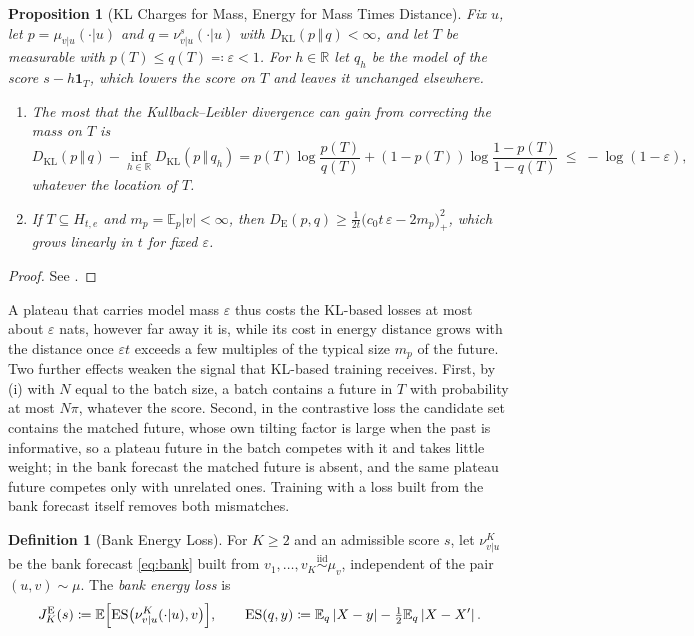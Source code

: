 \documentclass[11pt]{article}
\theoremstyle{plain}
\newtheorem{proposition}[theorem]{Proposition}
\theoremstyle{definition}
\newtheorem{definition}[theorem]{Definition}
\theoremstyle{remark}
\newcommand{\RR}{\mathbb{R}}
\newcommand{\E}{\mathbb{E}}
\newcommand{\define}{\coloneqq}
\newcommand{\KL}[2]{D_{\mathrm{KL}}\!\left(#1\,\Vert\,#2\right)}
\newcommand{\DE}{D_{\mathrm{E}}}
\newcommand{\abs}[1]{\left\lvert #1 \right\rvert}
\newcommand{\indicator}{\mathbf{1}}
\begin{document}
\begin{proposition}[KL Charges for Mass, Energy for Mass Times Distance]
 \label{prop:klvsenergy}
 Fix $u$, let $p=\mu_{v\vert u}(\cdot\vert u)$ and $q=\nu^{s}_{v\vert u}(\cdot\vert u)$
 with $\KL{p}{q}<\infty$, and let $T$ be measurable with
 $p(T)\le q(T)\eqqcolon\varepsilon<1$. For $h\in\RR$ let $q_h$ be the model of
 the score $s-h\indicator_T$, which lowers the score on $T$ and leaves it
 unchanged elsewhere.
 \begin{enumerate}[label=(\roman*)]
  \item The most that the Kullback--Leibler divergence can gain from
        correcting the mass on $T$ is
        \begin{equation*}
         \KL{p}{q}-\inf_{h\in\RR}\KL{p}{q_h}
         =p(T)\log\frac{p(T)}{q(T)}+(1-p(T))\log\frac{1-p(T)}{1-q(T)}
         \;\le\;-\log(1-\varepsilon),
        \end{equation*}
        whatever the location of $T$.
  \item If $T\subseteq H_{t,e}$ and $m_p=\E_p\abs{v}<\infty$, then
        $\DE(p,q)\ge\frac{1}{2t}\bigl(c_0t\,\varepsilon-2m_p\bigr)_{+}^{2}$,
        which grows linearly in $t$ for fixed $\varepsilon$.
 \end{enumerate}
\end{proposition}
\begin{proof}
 See .
\end{proof}

A plateau that carries model mass $\varepsilon$ thus costs the KL-based losses
at most about $\varepsilon$ nats, however far away it is, while its cost in
energy distance grows with the distance once $\varepsilon t$ exceeds a few
multiples of the typical size $m_p$ of the future. Two further effects weaken
the signal that KL-based training receives. First, by
(i) with $N$ equal to the batch size, a batch contains a
future in $T$ with probability at most $N\pi$, whatever the score. Second, in
the contrastive loss the candidate set contains the matched future, whose own
tilting factor is large when the past is informative, so a plateau future in
the batch competes with it and takes little weight; in the bank forecast the
matched future is absent, and the same plateau future competes only with
unrelated ones. Training with a loss built from the bank forecast itself
removes both mismatches.

\begin{definition}[Bank Energy Loss]
 \label{def:bankenergy}
 For $K\ge2$ and an admissible score $s$, let
 $\nu^{K}_{v\vert u}$ be the bank forecast \eqref{eq:bank} built from
 $v_1,\ldots,v_K\overset{\mathrm{iid}}{\sim}\mu_v$, independent of the pair
 $(u,v)\sim\mu$. The \emph{bank energy loss} is
 \begin{equation}
  J^{\mathrm{E}}_{K}(s)\define\E\Bigl[\mathrm{ES}\bigl(\nu^{K}_{v\vert u}(\cdot\vert u),v\bigr)\Bigr],
  \qquad
  \mathrm{ES}(q,y)\define\E_{q}\abs{X-y}-\tfrac12\E_{q}\abs{X-X'}.
  \label{eq:bankenergy}
 \end{equation}
\end{definition}
\end{document}
